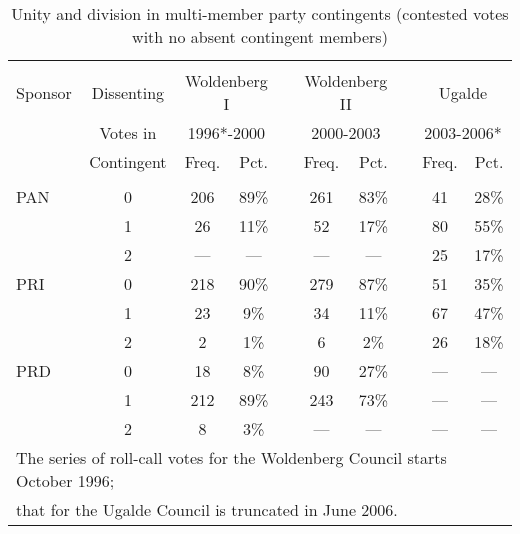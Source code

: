 \documentclass[12 pt, letter]{article}
\begin{document}
\begin{table}
\caption{Unity and division in multi-member party contingents (contested votes with no absent contingent members)}\label{T:unidiv}
\begin{center}
\begin{tabular}{lccccccccc}
\hline\\ [-1.5ex]
Sponsor & Dissenting & \multicolumn{2}{c}{ Woldenberg I} & & \multicolumn{2}{c}{ Woldenberg II} && \multicolumn{2}{c}{Ugalde} \\
 & Votes in & \multicolumn{2}{c}{1996*-2000} & & \multicolumn{2}{c}{2000-2003} && \multicolumn{2}{c}{2003-2006*} \\ \cline{3-4} \cline{6-7} \cline{9-10}
 & Contingent & Freq. & Pct. && Freq. & Pct. && Freq. & Pct.  \\
\hline \\ [-1ex]
PAN & 0 & 206 & 89\% & &261 & 83\% && 41 & 28\% \\
 &    1 &  26 & 11\% & & 52 & 17\% && 80 & 55\% \\
 &    2 & --- & ---  & &--- & ---  && 25 & 17\% \\ [1.3ex]
PRI & 0 & 218 & 90\% & &279 & 87\% && 51 & 35\% \\
 &    1 &  23 &  9\% & & 34 & 11\% && 67 & 47\% \\
 &    2 &   2 &  1\% & &  6 &  2\% && 26 & 18\% \\ [1.3ex]
PRD & 0 &  18 &  8\% & & 90 & 27\% && --- & --- \\
 &    1 & 212 & 89\% & &243 & 73\% && --- & --- \\
 &    2 &   8 &  3\% & &--- & ---  && --- & --- \\
\hline \multicolumn{10}{l}{\small *The series of roll-call votes for the Woldenberg Council starts October 1996;}\\
\multicolumn{10}{l}{\small that for the Ugalde Council is truncated in June 2006.}
\end{tabular}
\end{center}
\end{table}
\end{document}
